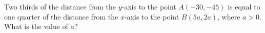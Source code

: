 Two thirds of the distance from the $y$-axis to the point $A(-30,-45)$ is equal to one quarter of the distance from the $x$-axis to the point $B(5a,2a)$, where $a>0$. What is the value of $a$?
